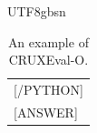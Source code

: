 \documentclass[11pt, a4paper, logo, copyright, nonumbering]{deepseek}
\begin{document}
\begin{CJK*}{UTF8}{gbsn}
\begin{table}[ht]
\begin{tabular}{p{12cm}}
[/PYTHON]\\

[ANSWER]\\
\bottomrule
\end{tabular}
    \caption{\centering An example of CRUXEval-O.}
    \label{tab:CRUXEval_O_eval_format_example}
\end{table}

\end{CJK*}
\end{document}
